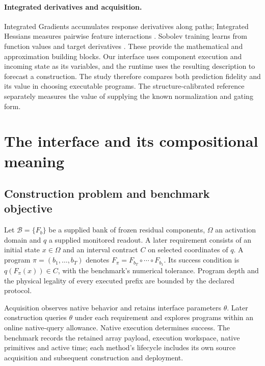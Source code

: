 \documentclass[11pt]{article}
\begin{document}
\paragraph{Integrated derivatives and acquisition.}
Integrated Gradients accumulates response derivatives along paths; Integrated
Hessians measures pairwise feature interactions \citep{ig,ih}. Sobolev training
learns from function values and target derivatives \citep{sobolev}. These
provide the mathematical and approximation building blocks. Our interface
uses component execution and incoming state as its variables, and the runtime
uses the resulting description to forecast a construction. The study therefore
compares both prediction fidelity and its value in choosing executable programs.
The structure-calibrated reference separately measures the value of supplying
the known normalization and gating form.

\begin{table}[t]
\centering\small

\caption{Methodological comparison. These works motivate the representation
and execution design; the numerical study compares our common-engine controls,
not performance on the cited works' application benchmarks.}
\label{tab:positioning}
\end{table}

\section{The interface and its compositional meaning}
\subsection{Construction problem and benchmark objective}
Let $\mathcal B=\{F_b\}$ be a supplied bank of frozen residual components,
$\Omega$ an activation domain and $q$ a supplied monitored readout. A later
requirement consists of an initial state $x\in\Omega$ and an interval contract
$C$ on selected coordinates of $q$. A program
$\pi=(b_1,\ldots,b_T)$ denotes
$F_\pi=F_{b_T}\circ\cdots\circ F_{b_1}$. Its success condition is
$q(F_\pi(x))\in C$, with the benchmark's numerical tolerance. Program depth
and the physical legality of every executed prefix are bounded by the declared
protocol.

Acquisition observes native behavior and retains interface parameters $\theta$.
Later construction queries $\theta$ under each requirement and explores
programs within an online native-query allowance. Native execution determines
success. The benchmark records the retained array payload, execution workspace,
native primitives and active time; each method's lifecycle includes its own
source acquisition and subsequent construction and deployment.
\end{document}
